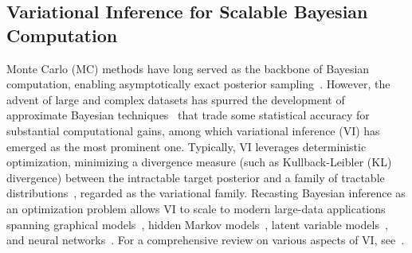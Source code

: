 \documentclass[12pt]{article}
\numberwithin{equation}{section}
\begin{document}
\subsection{Variational Inference for Scalable Bayesian Computation}

Monte Carlo (MC) methods have long served as the backbone of Bayesian computation, enabling asymptotically exact posterior sampling~\citep{Gelfand-MCMC-JASA,Neal2011HMC}. However, the advent of large and complex datasets has spurred the development of approximate Bayesian techniques~\citep{Rockova2017ParticleEM,RossellAbrilBhattacharya2021} that trade some statistical accuracy for substantial computational gains, among which variational inference (VI) has emerged as the most prominent one. Typically, VI leverages deterministic optimization, minimizing a divergence measure (such as Kullback-Leibler (KL) divergence) between the intractable target posterior and a family of tractable distributions~\citep{katsevich2024approximation}, regarded as the variational family. Recasting Bayesian inference as an optimization problem allows VI to scale to modern large-data applications spanning graphical models~\citep{Jordan1999-graphical-VI,Wainwright-Jordan-Graphical-VI}, hidden Markov models~\citep{MacKay-technical-report}, latent variable models~\citep{Blei-LDA-JMLR}, and neural networks~\citep{Graves-NN-VI}. For a comprehensive review on various aspects of VI, see~\cite{Blei-VI-review-JASA}.
\end{document}
